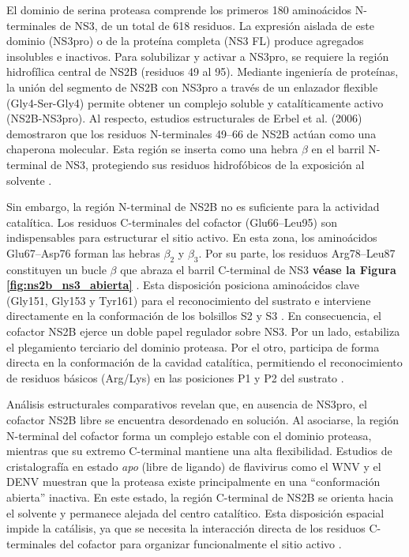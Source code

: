 El dominio de serina proteasa comprende los primeros 180 aminoácidos N-terminales de NS3, de un total de 618 residuos. La expresión aislada de este dominio (NS3pro) o de la proteína completa (NS3 FL) produce agregados insolubles e inactivos. Para solubilizar y activar a NS3pro, se requiere la región hidrofílica central de NS2B (residuos 49 al 95). Mediante ingeniería de proteínas, la unión del segmento de NS2B con NS3pro a través de un enlazador flexible (Gly4-Ser-Gly4) permite obtener un complejo soluble y catalíticamente activo (NS2B-NS3pro). Al respecto, estudios estructurales de Erbel et al. (2006) demostraron que los residuos N-terminales 49–66 de NS2B actúan como una chaperona molecular. Esta región se inserta como una hebra $\beta$ en el barril N-terminal de NS3, protegiendo sus residuos hidrofóbicos de la exposición al solvente \cite{lescar2008towards}.

Sin embargo, la región N-terminal de NS2B no es suficiente para la actividad catalítica. Los residuos C-terminales del cofactor (Glu66–Leu95) son indispensables para estructurar el sitio activo. En esta zona, los aminoácidos Glu67–Asp76 forman las hebras $\beta_2$ y $\beta_3$. Por su parte, los residuos Arg78–Leu87 constituyen un bucle $\beta$ que abraza el barril C-terminal de NS3 \textbf{véase la Figura \ref{fig:ns2b_ns3_abierta}} . Esta disposición posiciona aminoácidos clave (Gly151, Gly153 y Tyr161) para el reconocimiento del sustrato e interviene directamente en la conformación de los bolsillos S2 y S3 \cite{erbel2006structural}. En consecuencia, el cofactor NS2B ejerce un doble papel regulador sobre NS3. Por un lado, estabiliza el plegamiento terciario del dominio proteasa. Por el otro, participa de forma directa en la conformación de la cavidad catalítica, permitiendo el reconocimiento de residuos básicos (Arg/Lys) en las posiciones P1 y P2 del sustrato \cite{luo2015flavivirus}.

Análisis estructurales comparativos revelan que, en ausencia de NS3pro, el cofactor NS2B libre se encuentra desordenado en solución. Al asociarse, la región N-terminal del cofactor forma un complejo estable con el dominio proteasa, mientras que su extremo C-terminal mantiene una alta flexibilidad. Estudios de cristalografía en estado \textit{apo} (libre de ligando) de flavivirus como el WNV y el DENV muestran que la proteasa existe principalmente en una ``conformación abierta'' inactiva. En este estado, la región C-terminal de NS2B se orienta hacia el solvente y permanece alejada del centro catalítico. Esta disposición espacial impide la catálisis, ya que se necesita la interacción directa de los residuos C-terminales del cofactor para organizar funcionalmente el sitio activo \cite{li2020insights}.

